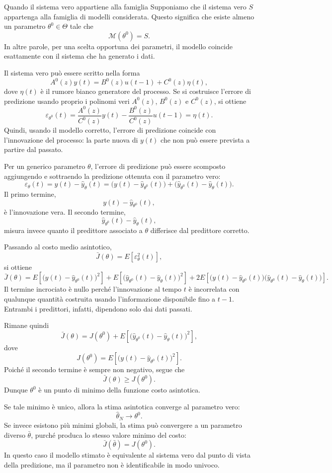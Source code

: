 \documentclass[11pt,a4paper]{article}
\begin{document}
\begin{spiegazione}{Quando il sistema vero appartiene alla famiglia}
Supponiamo che il sistema vero $S$ appartenga alla famiglia di modelli considerata. Questo significa che esiste almeno un parametro $\theta^0 \in \Theta$ tale che
\[
\mathcal M(\theta^0)=S.
\]
In altre parole, per una scelta opportuna dei parametri, il modello coincide esattamente con il sistema che ha generato i dati.

Il sistema vero può essere scritto nella forma
\[
A^0(z)y(t)=B^0(z)u(t-1)+C^0(z)\eta(t),
\]
dove $\eta(t)$ è il rumore bianco generatore del processo. Se si costruisce l'errore di predizione usando proprio i polinomi veri $A^0(z)$, $B^0(z)$ e $C^0(z)$, si ottiene
\[
\varepsilon_{\theta^0}(t)
=
\frac{A^0(z)}{C^0(z)}y(t)
-
\frac{B^0(z)}{C^0(z)}u(t-1)
=
\eta(t).
\]
Quindi, usando il modello corretto, l'errore di predizione coincide con l'innovazione del processo: la parte nuova di $y(t)$ che non può essere prevista a partire dal passato.

Per un generico parametro $\theta$, l'errore di predizione può essere scomposto aggiungendo e sottraendo la predizione ottenuta con il parametro vero:
\[
\varepsilon_\theta(t)
=
y(t)-\hat y_\theta(t)
=
\bigl(y(t)-\hat y_{\theta^0}(t)\bigr)
+
\bigl(\hat y_{\theta^0}(t)-\hat y_\theta(t)\bigr).
\]
Il primo termine,
\[
y(t)-\hat y_{\theta^0}(t),
\]
è l'innovazione vera. Il secondo termine,
\[
\hat y_{\theta^0}(t)-\hat y_\theta(t),
\]
misura invece quanto il predittore associato a $\theta$ differisce dal predittore corretto.

Passando al costo medio asintotico,
\[
\bar J(\theta)=E[\varepsilon_\theta^2(t)],
\]
si ottiene
\[
\bar J(\theta)
=
E\left[
\bigl(y(t)-\hat y_{\theta^0}(t)\bigr)^2
\right]
+
E\left[
\bigl(\hat y_{\theta^0}(t)-\hat y_\theta(t)\bigr)^2
\right]
+
2E\left[
\bigl(y(t)-\hat y_{\theta^0}(t)\bigr)
\bigl(\hat y_{\theta^0}(t)-\hat y_\theta(t)\bigr)
\right].
\]
Il termine incrociato è nullo perché l'innovazione al tempo $t$ è incorrelata con qualunque quantità costruita usando l'informazione disponibile fino a $t-1$. Entrambi i predittori, infatti, dipendono solo dai dati passati.

Rimane quindi
\[
\bar J(\theta)
=
J(\theta^0)
+
E\left[
\bigl(\hat y_{\theta^0}(t)-\hat y_\theta(t)\bigr)^2
\right],
\]
dove
\[
J(\theta^0)
=
E\left[
\bigl(y(t)-\hat y_{\theta^0}(t)\bigr)^2
\right].
\]
Poiché il secondo termine è sempre non negativo, segue che
\[
\bar J(\theta)\geq J(\theta^0).
\]
Dunque $\theta^0$ è un punto di minimo della funzione costo asintotica.

Se tale minimo è unico, allora la stima asintotica converge al parametro vero:
\[
\hat \theta_N \to \theta^0.
\]
Se invece esistono più minimi globali, la stima può convergere a un parametro diverso $\bar\theta$, purché produca lo stesso valore minimo del costo:
\[
\bar J(\bar\theta)=J(\theta^0).
\]
In questo caso il modello stimato è equivalente al sistema vero dal punto di vista della predizione, ma il parametro non è identificabile in modo univoco.
\end{spiegazione}
\end{document}
